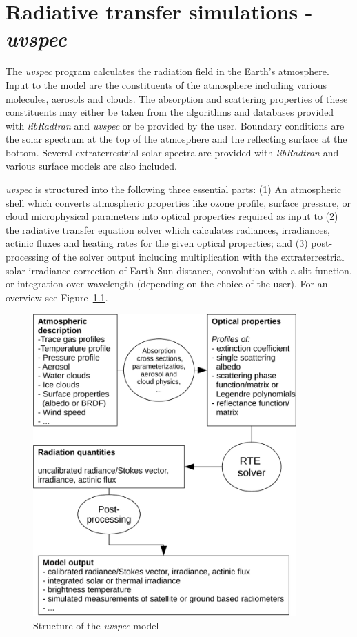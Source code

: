 \chapter{Radiative transfer simulations - {\sl uvspec}}
\label{chap:rt}

The {\sl uvspec} program calculates the radiation field in the
Earth's atmosphere. Input to the model are the constituents of the
atmosphere including various molecules, aerosols and clouds. The
absorption and scattering properties of these constituents may either
be taken from the algorithms and databases provided with {\sl
  libRadtran} and {\sl uvspec} or be provided by the user. Boundary
conditions are the solar spectrum at the top of the atmosphere and the
reflecting surface at the bottom. Several extraterrestrial solar
spectra are provided with {\sl libRadtran} and various surface models
are also included. 

{\sl uvspec} is structured into the following three
essential parts:  (1) An atmospheric shell 
which converts atmospheric properties like ozone profile, surface
pressure, or cloud microphysical parameters into optical properties
required as input to (2) the radiative transfer equation solver which
calculates radiances, irradiances, actinic fluxes and heating rates
for the given optical properties; and (3) post-processing of the
solver output including multiplication with the extraterrestrial solar
irradiance correction of Earth-Sun distance, convolution with a
slit-function, or integration over wavelength (depending on the choice
of the user). For an overview see Figure~\ref{fig:uvspec_structure}.
\begin{figure}[htbp]
  \centering
  \includegraphics[width=0.9\textwidth]{figs/figure1}
  \caption{Structure of the {\sl uvspec} model}
  \label{fig:uvspec_structure}
\end{figure}


